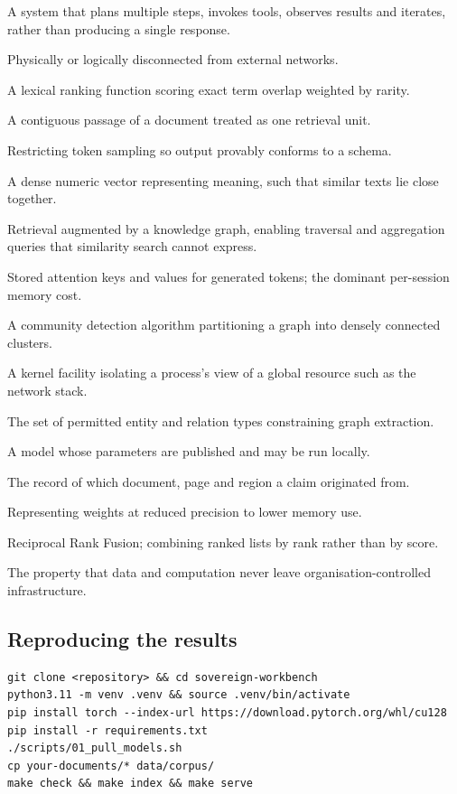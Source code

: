 \begin{description}[leftmargin=0pt,style=nextline,itemsep=3pt]
\item[Agentic] A system that plans multiple steps, invokes tools, observes
results and iterates, rather than producing a single response.
\item[Air-gapped] Physically or logically disconnected from external networks.
\item[BM25] A lexical ranking function scoring exact term overlap weighted by
rarity.
\item[Chunk] A contiguous passage of a document treated as one retrieval unit.
\item[Constrained decoding] Restricting token sampling so output provably
conforms to a schema.
\item[Embedding] A dense numeric vector representing meaning, such that similar
texts lie close together.
\item[Graph RAG] Retrieval augmented by a knowledge graph, enabling traversal
and aggregation queries that similarity search cannot express.
\item[KV cache] Stored attention keys and values for generated tokens; the
dominant per-session memory cost.
\item[Leiden] A community detection algorithm partitioning a graph into densely
connected clusters.
\item[Namespace] A kernel facility isolating a process's view of a global
resource such as the network stack.
\item[Ontology] The set of permitted entity and relation types constraining
graph extraction.
\item[Open-weight] A model whose parameters are published and may be run
locally.
\item[Provenance] The record of which document, page and region a claim
originated from.
\item[Quantisation] Representing weights at reduced precision to lower memory
use.
\item[RRF] Reciprocal Rank Fusion; combining ranked lists by rank rather than
by score.
\item[Sovereignty] The property that data and computation never leave
organisation-controlled infrastructure.
\end{description}

\subsection{Reproducing the results}

\begin{lstlisting}
git clone <repository> && cd sovereign-workbench
python3.11 -m venv .venv && source .venv/bin/activate
pip install torch --index-url https://download.pytorch.org/whl/cu128
pip install -r requirements.txt
./scripts/01_pull_models.sh
cp your-documents/* data/corpus/
make check && make index && make serve
\end{lstlisting}
